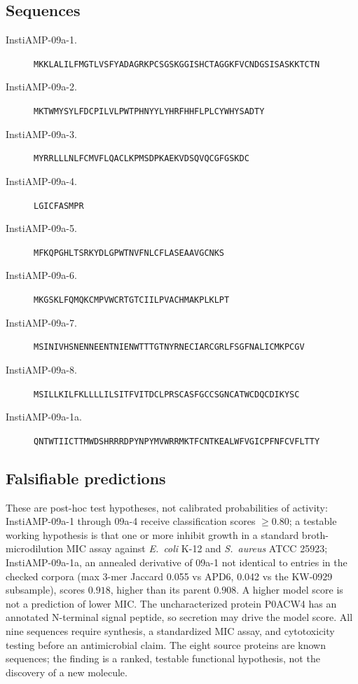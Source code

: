 \subsection{Sequences}
\begin{description}
\item[InstiAMP-09a-1.] \texttt{MKKLALILFMGTLVSFYADAGRKPCSGSKGGISHCTAGGKFVCNDGSISASKKTCTN}
\item[InstiAMP-09a-2.] \texttt{MKTWMYSYLFDCPILVLPWTPHNYYLYHRFHHFLPLCYWHYSADTY}
\item[InstiAMP-09a-3.] \texttt{MYRRLLLNLFCMVFLQACLKPMSDPKAEKVDSQVQCGFGSKDC}
\item[InstiAMP-09a-4.] \texttt{LGICFASMPR}
\item[InstiAMP-09a-5.] \texttt{MFKQPGHLTSRKYDLGPWTNVFNLCFLASEAAVGCNKS}
\item[InstiAMP-09a-6.] \texttt{MKGSKLFQMQKCMPVWCRTGTCIILPVACHMAKPLKLPT}
\item[InstiAMP-09a-7.] \texttt{MSINIVHSNENNEENTNIENWTTTGTNYRNECIARCGRLFSGFNALICMKPCGV}
\item[InstiAMP-09a-8.] \texttt{MSILLKILFKLLLLILSITFVITDCLPRSCASFGCCSGNCATWCDQCDIKYSC}
\item[InstiAMP-09a-1a.] \texttt{QNTWTIICTTMWDSHRRRDPYNPYMVWRRMKTFCNTKEALWFVGICPFNFCVFLTTY}
\end{description}

\subsection{Falsifiable predictions}
These are post-hoc test hypotheses, not calibrated probabilities of activity:
InstiAMP-09a-1 through 09a-4 receive classification scores $\ge 0.80$;
a testable working hypothesis is that one or more inhibit growth in a
standard broth-microdilution MIC assay against \emph{E.~coli} K-12 and \emph{S.~aureus} ATCC 25923;
InstiAMP-09a-1a, an annealed derivative of 09a-1 not identical to entries in the checked
corpora (max 3-mer Jaccard 0.055 vs APD6, 0.042 vs the KW-0929 subsample),
scores $0.918$, higher than its parent $0.908$. A higher model score is not
a prediction of lower MIC. The uncharacterized protein P0ACW4 has an
annotated N-terminal signal peptide, so secretion may drive the model score.
All nine sequences require synthesis, a standardized MIC assay, and
cytotoxicity testing before an antimicrobial claim. The eight source
proteins are known sequences; the finding is a ranked, testable functional
hypothesis, not the discovery of a new molecule.
